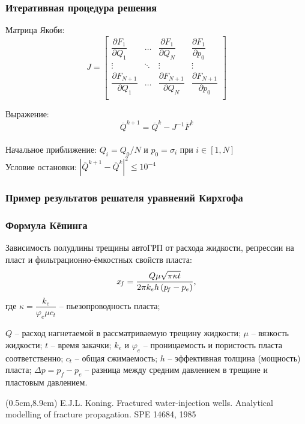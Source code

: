 \documentclass{beamer}
\begin{document}
\begin{frame}
\frametitle{Итеративная процедура решения}
Матрица Якоби:
$$J = \begin{bmatrix}
	\dfrac{\partial F_1}{\partial Q_1} & \dots & \dfrac{\partial F_1}{\partial Q_N} & \dfrac{\partial F_1}{\partial p_0} \\
	\vdots & \ddots & \vdots & \vdots \\
	\dfrac{\partial F_{N+1}}{\partial Q_1} & \dots & \dfrac{\partial F_{N+1}}{\partial Q_N} & \dfrac{\partial F_{N+1}}{\partial p_0} \\
	\end{bmatrix}
$$

Выражение:
$$\overline{Q}^{k+1}=\overline{Q}^k-J^{-1}\overline{F}^k$$
\ \\

Начальное приближение:
$Q_i=Q_0/N\text{ и }p_0=\sigma_i\text{ при } i\in\left[1,N\right]$
\ \\

Условие остановки:
$\left|\overline{Q}^{k+1}-\overline{Q}^k\right|^2\leqslant10^{-4}$

\end{frame}


\begin{frame}
\frametitle{Пример результатов решателя уравнений Кирхгофа}

\end{frame}


\begin{frame}
\frametitle{Формула Кёнинга}
Зависимость полудлины трещины автоГРП от расхода жидкости, репрессии на пласт и фильтрационно-ёмкостных свойств пласта:
$$
x_{\!f}=\frac{Q\mu\sqrt{\pi\kappa t}}{2\pi k_eh\left(p_{\!f}-p_e\right)},
\vspace*{-3mm}
$$
\small
где
$\kappa=\dfrac{k_e}{\varphi_e\mu c_t}$ -- пьезопроводность пласта;\newline

$Q$ -- расход нагнетаемой в рассматриваемую трещину жидкости;\newline
$\mu$ -- вязкость жидкости;\newline
$t$ -- время закачки;
$k_e$ и $\varphi_e$ -- проницаемость и пористость пласта соответственно;
$c_t$ -- общая сжимаемость;
$h$ -- эффективная толщина (мощность) пласта;
$\Delta p=p_f-p_e$ -- разница между средним давлением в трещине и пластовым давлением.
\normalsize

\begin{textblock*}{6cm}(0.5cm,8.9cm)
\tiny
\textcolor{lit_gray}{E.J.L. Koning. Fractured water-injection wells. Analytical modelling of fracture propagation. SPE 14684, 1985}
\end{textblock*}

\normalsize


\end{frame}
\end{document}

